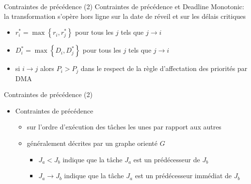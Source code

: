 \begin{frame}{Contraintes de précédence (2)} 
  Contraintes de  précédence et Deadline  Monotonic: la transformation
  s'opère hors ligne sur la date de réveil et sur les délais critiques
  \begin{itemize}
  \item $r^*_i =  \max \left\{ r_i, r^*_j \right\}$  pour tous les $j$
    tels que $j → i$
  \item $D^*_i =  \max \left\{ D_i, D^*_j \right\}$  pour tous les $j$
    tels que $j → i$
  \item  si $i  →  j$  alors $P_i  >  P_j$ dans  le
    respect de la règle d'affectation des priorités par DMA
  \end{itemize} 
\end{frame} 

\begin{frame}{Contraintes de précédence (2)} 
  \begin{itemize}
  \item Contraintes de précédence 
    \begin{itemize}
    \item sur l'ordre d'exécution des  tâches les unes par rapport aux
      autres
    \item généralement décrites par un graphe orienté $G$
      \begin{itemize}
      \item $J_a < J_b$ indique que la tâche $J_a$ est un prédécesseur
        de $J_b$
      \item $J_a → J_b$ indique que la tâche $J_a$ est un prédécesseur
        immédiat de $J_b$
      \end{itemize}
    \end{itemize}
  \end{itemize}
\end{frame}

